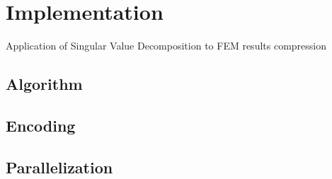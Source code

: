 \section{Implementation}
\label{section:implementation}

Application of Singular Value Decomposition to FEM results compression

\subsection{Algorithm}

\subsection{Encoding}

\subsection{Parallelization}
